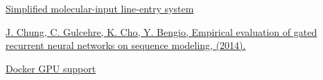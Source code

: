 \documentclass[conference]{IEEEtran}
\begin{document}
\begin{thebibliography}{1}

\href{https://en.wikipedia.org/wiki/Simplified_molecular-input_line-entry_system/}{Simplified molecular-input line-entry system}

\href{http://arxiv.org/abs/1412.3555/}{J. Chung, C. Gulcehre, K. Cho, Y. Bengio, Empirical evaluation of gated recurrent neural networks on sequence modeling, (2014).}

\href{https://docs.docker.com/compose/gpu-support/}{Docker GPU support}

\end{thebibliography}
\end{document}
